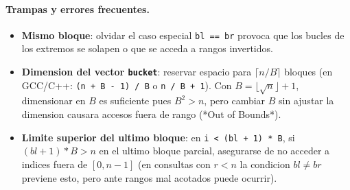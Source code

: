 \paragraph{Trampas y errores frecuentes.}
\begin{itemize}\setlength\itemsep{0pt}
	\item \textbf{Mismo bloque}: olvidar el caso especial \verb|bl == br| provoca que los bucles de los extremos se solapen o que se acceda a rangos invertidos.
	\item \textbf{Dimension del vector \texttt{bucket}}: reservar espacio para $\lceil n / B \rceil$ bloques (en GCC/C++: \verb|(n + B - 1) / B| o \verb|n / B + 1|). Con $B = \lfloor \sqrt{n} \rfloor + 1$, dimensionar en $B$ es suficiente pues $B^2 > n$, pero cambiar $B$ sin ajustar la dimension causara accesos fuera de rango (*Out of Bounds*).
	\item \textbf{Limite superior del ultimo bloque}: en \verb|i < (bl + 1) * B|, si $(bl + 1) * B > n$ en el ultimo bloque parcial, asegurarse de no acceder a indices fuera de $[0, n - 1]$ (en consultas con $r < n$ la condicion $bl \ne br$ previene esto, pero ante rangos mal acotados puede ocurrir).
\end{itemize}

